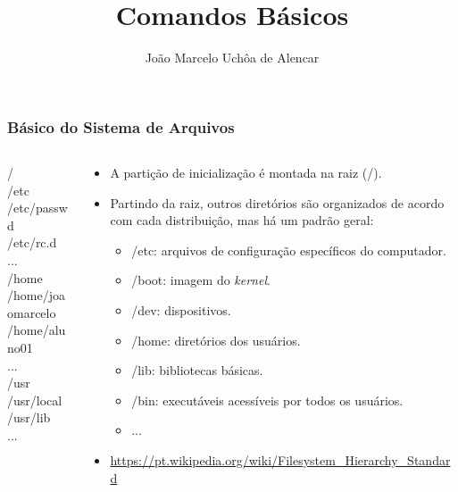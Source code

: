 \documentclass{beamer}
\title{Comandos Básicos}
\author[João Marcelo Uchôa de Alencar]{João Marcelo Uchôa de Alencar}
\institute{Universidade Federal do Ceará - Quixadá}
\begin{document}
   \begin{frame}
      \titlepage
   \end{frame}

   \begin{frame}
      \frametitle{Básico do Sistema de Arquivos}
      \begin{columns}
      \begin{column}{0.4\textwidth}
      / \\
      \hspace{0.5cm}/etc  \\
      \hspace{1.0cm}/etc/passwd \\
      \hspace{1.0cm}/etc/rc.d \\
      \hspace{1.0cm} ... \\
      \hspace{0.5cm}/home \\ 
      \hspace{1.0cm}/home/joaomarcelo \\ 
      \hspace{1.0cm}/home/aluno01 \\ 
      \hspace{1.0cm} ... \\
      \hspace{0.5cm}/usr \\ 
      \hspace{1.0cm}/usr/local \\ 
      \hspace{1.0cm}/usr/lib \\ 
      \hspace{1.0cm} ... \\
      \end{column}
      \begin{column}{0.6\textwidth}
      \scriptsize
      \begin{itemize}
         \item A partição de inicialização é montada na raiz (/).
	 \item Partindo da raiz, outros diretórios são organizados de acordo com cada distribuição, mas há um padrão geral:
	 \begin{itemize}
           \scriptsize
	    \item /etc: arquivos de configuração específicos do computador.
	    \item /boot: imagem do \textit{kernel}.
	    \item /dev: dispositivos.
	    \item /home: diretórios dos usuários.
	    \item /lib: bibliotecas básicas.
	    \item /bin: executáveis acessíveis por todos os usuários.
	    \item ...
	 \end{itemize}
	 \item \url{https://pt.wikipedia.org/wiki/Filesystem_Hierarchy_Standard}
      \end{itemize}
      \end{column}
      \end{columns}
   \end{frame}
\end{document}
